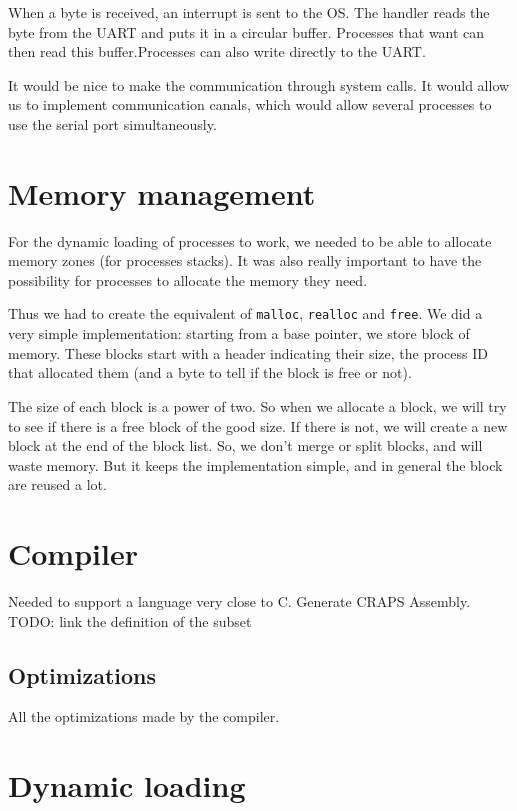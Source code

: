 \documentclass[openany, a4paper]{book}
\begin{document}
         When a byte is received, an interrupt is sent to the OS. The handler
         reads the byte from the UART and puts it in a circular buffer.
         Processes that want can then read this buffer.Processes can also write
         directly to the UART.

        It would be nice to make the communication through system calls. It
        would allow us to implement communication canals, which would allow
        several processes to use the serial port simultaneously. 



    \section{Memory management}
      For the dynamic loading of processes to work, we needed to be able to
      allocate memory zones (for processes stacks). It was also really important
      to have the possibility for processes to allocate the memory they need.

      Thus we had to create the equivalent of \verb+malloc+, \verb+realloc+ and
      \verb+free+. We did a very
      simple implementation: starting from a base pointer, we store block of
      memory. These blocks start with a header indicating their size, the
      process ID that allocated them (and a byte to tell if the block is free or
      not).

      The size of each block is a power of two. So when we allocate a block, we
      will try to see if there is a free block of the good size. If there is
      not, we will create a new block at the end of the block list.
      So, we don't merge or split blocks, and will waste memory. But it keeps
      the implementation simple, and in general the block are reused a lot.

    \section{Compiler}
      Needed to support a language very close to C. Generate CRAPS Assembly.
      TODO: link the definition of the subset

      \subsection{Optimizations}
        All the optimizations made by the compiler.

    \section{Dynamic loading}
\end{document}
